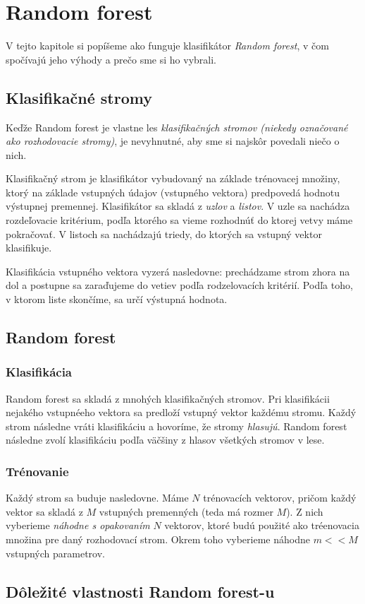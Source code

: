 \chapter{Random forest}

V tejto kapitole si popíšeme ako funguje klasifikátor \textit{Random forest}, v čom spočívajú jeho výhody a prečo sme si ho vybrali.

\section{Klasifikačné stromy}
Keďže Random forest je vlastne les \textit{klasifikačných stromov (niekedy označované ako rozhodovacie stromy)}, je nevyhnutné, aby sme si najskôr povedali niečo o nich.

Klasifikačný strom je klasifikátor vybudovaný na základe trénovacej množiny, ktorý na základe vstupných údajov (vstupného vektora) predpovedá hodnotu výstupnej premennej. Klasifikátor sa skladá z \textit{uzlov} a \textit{listov}. V uzle sa nachádza rozdeľovacie kritérium, podľa ktorého sa vieme rozhodnúť do ktorej vetvy máme pokračovať. V listoch sa nachádzajú triedy, do ktorých sa vstupný vektor klasifikuje.

Klasifikácia vstupného vektora vyzerá nasledovne: prechádzame strom zhora na dol a postupne sa zaraďujeme do vetiev podľa rodzelovacích kritérií. Podľa toho, v ktorom liste skončíme, sa určí výstupná hodnota.


\section{Random forest}

\subsection{Klasifikácia}
Random forest sa skladá z mnohých klasifikačných stromov. Pri klasifikácii nejakého vstupnéeho vektora sa predloží vstupný vektor každému stromu. Každý strom následne vráti klasifikáciu a hovoríme, že stromy \textit{hlasujú}. Random forest následne zvolí klasifikáciu podľa väčšiny z hlasov všetkých stromov v lese.

\subsection{Trénovanie}
Každý strom sa buduje nasledovne.
Máme $N$ trénovacích vektorov, pričom každý vektor sa skladá z $M$ vstupných premenných (teda má rozmer $M$). 
Z nich vyberieme \textit{náhodne s opakovaním} $N$ vektorov, ktoré budú použité ako tréenovacia množina pre daný rozhodovací strom.
Okrem toho vyberieme náhodne $m<<M$ vstupných parametrov.

\section{Dôležité vlastnosti Random forest-u}




